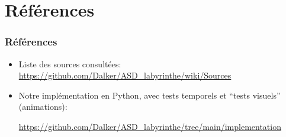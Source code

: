 \documentclass[]{beamer}
\begin{document}
\section{Références}
\begin{frame}
  \frametitle{Références}
  \begin{itemize}
  \item Liste des sources consultées:
    \url{https://github.com/Dalker/ASD_labyrinthe/wiki/Sources}
  \item Notre implémentation en Python, avec tests temporels et ``tests
    visuels'' (animations):
    
    \url{https://github.com/Dalker/ASD_labyrinthe/tree/main/implementation}
  \end{itemize}
\end{frame}
\end{document}

